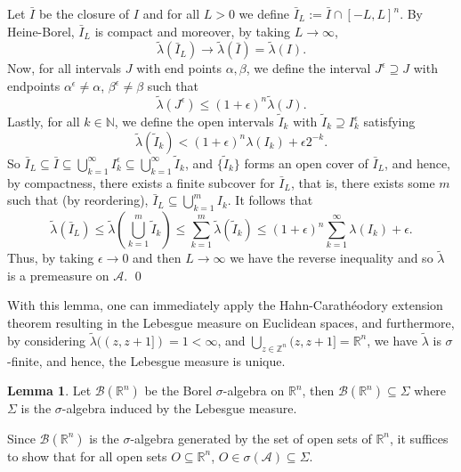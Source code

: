 \documentclass[
]{article}
\theoremstyle{definition}
\theoremstyle{definition}
\newtheorem{lemma}{Lemma}[section]
\begin{document}
Let \(\bar{I}\) be the closure of \(I\) and for all \(L > 0\) we define
\(\bar{I}_L := \bar{I} \cap [-L, L]^n\). By Heine-Borel, \(\bar{I}_L\)
is compact and moreover, by taking \(L \to \infty\),
\[\tilde\lambda(\bar{I}_L) \to \tilde\lambda(\bar{I}) = \tilde\lambda(I).\]
Now, for all intervals \(J\) with end points \(\alpha, \beta\), we
define the interval \(J^\epsilon \supseteq J\) with endpoints
\(\alpha^\epsilon \neq \alpha\), \(\beta^\epsilon \neq \beta\) such that
\[\tilde\lambda(J^\epsilon) \le (1 + \epsilon)^n \tilde\lambda(J).\]
Lastly, for all \(k \in \mathbb{N}\), we define the open intervals
\(\tilde I_k\) with \(\tilde I_k \supseteq I_k^\epsilon\) satisfying
\[\tilde\lambda(\tilde I_k) < (1 + \epsilon)^n \lambda(I_k) + \epsilon 2^{-k}.\]
So
\(\bar{I}_L \subseteq \bar{I} \subseteq \bigcup_{k = 1}^\infty I_k^\epsilon  \subseteq \bigcup_{k = 1}^\infty \tilde I_k\),
and \(\{\tilde I_k\}\) forms an open cover of \(\bar{I}_L\), and hence,
by compactness, there exists a finite subcover for \(\bar{I}_L\), that
is, there exists some \(m\) such that (by reordering),
\(\bar{I}_L \subseteq \bigcup_{k = 1}^m I_k\). It follows that
\[\tilde\lambda(\bar{I}_L) \le \tilde\lambda\left(\bigcup_{k = 1}^m \tilde I_k\right) 
    \le \sum_{k = 1}^m \tilde\lambda(\tilde I_k) 
    \le (1 + \epsilon)^n \sum_{k = 1}^\infty \lambda(I_k) + \epsilon.\]
Thus, by taking \(\epsilon \to 0\) and then \(L \to \infty\) we have the
reverse inequality and so \(\tilde\lambda\) is a premeasure on
\(\mathcal{A}\). \qed

With this lemma, one can immediately apply the Hahn-Carathéodory
extension theorem resulting in the Lebesgue measure on Euclidean spaces,
and furthermore, by considering
\(\tilde\lambda((z, z + 1]) = 1 < \infty\), and
\(\bigcup_{z \in \mathbb{Z}^n}(z, z + 1] = \mathbb{R}^n\), we have
\(\tilde\lambda\) is \(\sigma\)-finite, and hence, the Lebesgue measure
is unique.

\begin{lemma}
  Let \(\mathcal{B}(\mathbb{R}^n)\) be the Borel \(\sigma\)-algebra on \(\mathbb{R}^n\), 
  then \(\mathcal{B}(\mathbb{R}^n) \subseteq \Sigma\) where \(\Sigma\) is the 
  \(\sigma\)-algebra induced by the Lebesgue measure.
\end{lemma}
\proof

Since \(\mathcal{B}(\mathbb{R}^n)\) is the \(\sigma\)-algebra generated
by the set of open sets of \(\mathbb{R}^n\), it suffices to show that
for all open sets \(O \subseteq \mathbb{R}^n\),
\(O \in \sigma(\mathcal{A}) \subseteq \Sigma\).
\end{document}
